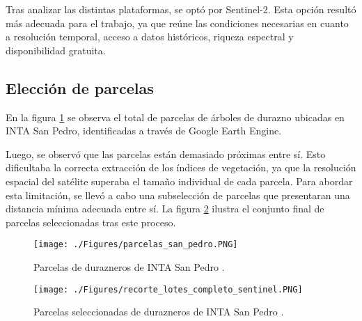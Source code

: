 Tras analizar las distintas plataformas, se optó por Sentinel-2. Esta opción resultó más adecuada 
para el trabajo, ya que reúne las condiciones necesarias en cuanto a resolución temporal, acceso a 
datos históricos, riqueza espectral y disponibilidad gratuita.

\subsection{Elección de parcelas}

En la figura \ref{fig:parcelasSP} se observa el total de parcelas de árboles de durazno ubicadas 
en INTA San Pedro, identificadas a través de Google Earth Engine. 

Luego, se observó que las parcelas están demasiado próximas entre sí. Esto dificultaba la correcta
extracción de los índices de vegetación, ya que la resolución espacial del satélite superaba el tamaño
individual de cada parcela. Para abordar esta limitación, se llevó a cabo una subselección de 
parcelas que presentaran una distancia mínima adecuada entre sí. La figura \ref{fig:parcelasfinalSP} 
ilustra el conjunto final de parcelas seleccionadas tras este proceso.

\begin{figure}[h]
	\centering
	\texttt{[image: ./Figures/parcelas\_san\_pedro.PNG]}
	\caption{Parcelas de durazneros de INTA San Pedro \protect\footnotemark.}
	\label{fig:parcelasSP}
\end{figure}

\begin{figure}[h]
	\centering
	\texttt{[image: ./Figures/recorte\_lotes\_completo\_sentinel.PNG]}
	\caption{Parcelas seleccionadas de durazneros de INTA San Pedro \protect\footnotemark.}
	\label{fig:parcelasfinalSP}
\end{figure}


